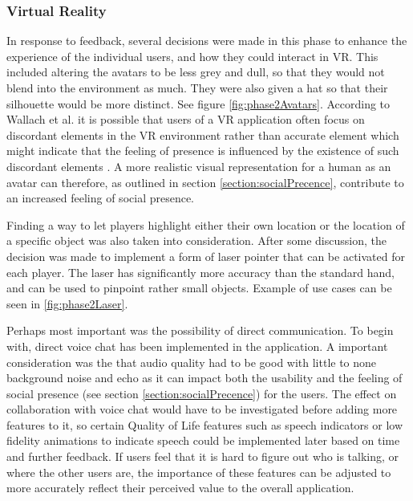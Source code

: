 \subsubsection{Virtual Reality}
In response to feedback, several decisions were made in this phase to enhance the experience of the individual users, and how they could interact in VR. This included altering the avatars to be less grey and dull, so that they would not blend into the environment as much. They were also given a hat so that their silhouette would be more distinct.  See figure \ref{fig:phase2Avatars}.
According  to  Wallach  et  al. it is possible that users of a VR application often focus on discordant elements in the VR environment rather than accurate element which might indicate that the feeling of presence is influenced by the existence of such discordant elements \cite{presenceInVirtualReality:}. A more realistic visual representation for a human as an avatar can therefore, as outlined in section \ref{section:socialPrecence}, contribute to an increased feeling of social presence. 

Finding a way to let players highlight either their own location or the location of a specific object was also taken into consideration. After some discussion, the decision was made to implement a form of laser pointer that can be activated for each player. The laser has significantly more accuracy than the standard hand, and can be used to pinpoint rather small objects. Example of use cases can be seen in \ref{fig:phase2Laser}.

Perhaps most important was the possibility of direct communication. To begin with, direct voice chat has been implemented in the application. A important consideration was the that audio quality had to be good with little to none background noise and echo as it can impact both the usability and the feeling of social presence (see section \ref{section:socialPrecence}) for the users. 
The effect on collaboration with voice chat would have to be investigated before adding more features to it, so certain Quality of Life features such as speech indicators or low fidelity animations to indicate speech could be implemented later based on time and further feedback. If users feel that it is hard to figure out who is talking, or where the other users are, the importance of these features can be adjusted to more accurately reflect their perceived value to the overall application.





